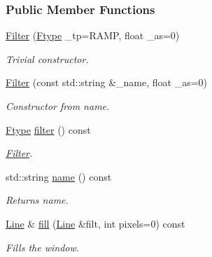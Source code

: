 \subsubsection*{Public Member Functions}
\begin{DoxyCompactItemize}
\item 
\hyperlink{classFilter_aa4e9998a49d027efc1217a850867357c}{Filter} (\hyperlink{classFilter_aa61599baec09f1011f80edc1e9118728}{Ftype} \_\-tp=RAMP, float \_\-as=0)
\begin{DoxyCompactList}\small\item\em Trivial constructor. \item\end{DoxyCompactList}\item 
\hyperlink{classFilter_a1edffffd95e96e1da86f8ec75f807264}{Filter} (const std::string \&\_\-name, float \_\-as=0)
\begin{DoxyCompactList}\small\item\em Constructor from name. \item\end{DoxyCompactList}\item 
\hyperlink{classFilter_aa61599baec09f1011f80edc1e9118728}{Ftype} \hyperlink{classFilter_a3245bbada6499568783cb2705a69db04}{filter} () const 
\begin{DoxyCompactList}\small\item\em \hyperlink{classFilter}{Filter}. \item\end{DoxyCompactList}\item 
std::string \hyperlink{classFilter_a81c6f3de0639b637ab20d4b7b65cb1eb}{name} () const 
\begin{DoxyCompactList}\small\item\em Returns name. \item\end{DoxyCompactList}\item 
\hyperlink{group__Types_ga4ce3fdeba27702c8b09a141e22709e38}{Line} \& \hyperlink{classFilter_a465df3da231eb2d971f6d34342ed46f1}{fill} (\hyperlink{group__Types_ga4ce3fdeba27702c8b09a141e22709e38}{Line} \&filt, int pixels=0) const 
\begin{DoxyCompactList}\small\item\em Fills the window. \item\end{DoxyCompactList}\end{DoxyCompactItemize}
